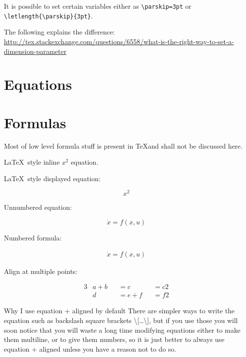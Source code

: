 \documentclass[12pt]{article}
\begin{document}
It is possible to set certain variables either as \lstinline|\parskip=3pt| or \lstinline|\letlength{\parskip}{3pt}|.

The following explains the difference: \url{http://tex.stackexchange.com/questions/6558/what-is-the-right-way-to-set-a-dimension-parameter}

\section{Equations}\label{equations}

\section{Formulas}\label{formulas}

Most of low level formula stuff is present in \TeX and shall not be discussed here.

\LaTeX\ style inline \(x^2\) equation.

\LaTeX\ style displayed equation:

\[ x^2 \]

Unnumbered equation:

\begin{equation*}
\dot{x} = f(x,u)
\end{equation*}

Numbered formula:

\begin{equation}\begin{aligned}\label{eqFor1}
\dot{x} = f(x,u)
\end{aligned}\end{equation}

Align at multiple points:

\begin{alignat*}{3}
& a + b && = c   && = c2 \\
& d   && = e + f && = f2
\end{alignat*}

\begin{remark}\label{remFor1} Why I use equation + aligned by default
There are simpler ways to write the equation such as backslash square brackets \textbackslash{}[\ldots\textbackslash{}], but if you use those you will soon notice that you will waste a long time modifying equations either to make them multiline, or to give them numbers, so it is just better to always use equation + aligned unless you have a reason not to do so.
\end{remark}
\end{document}
